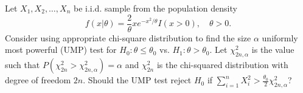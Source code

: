 \begin{problem} 
Let $X_1, X_2, \ldots, X_n$ be i.i.d. sample from the population density
	\[
	f(x|\theta) = \frac{2}{\theta}xe^{-x^2/\theta} I(x>0), \quad \theta>0.
	\] 
Consider using appropriate chi-square distribution to find the size $\alpha$ uniformly most powerful (UMP) test for $H_0: \theta\le \theta_0$ vs. $H_1: \theta> \theta_0$. Let $\chi_{2n, \alpha}^2$ is the value such that $P(\chi_{2n}^2 > \chi_{2n, \alpha}^2) = \alpha$ and $\chi_{2n}^2$ is the chi-squared distribution with degree of freedom $2n$. Should the UMP test reject $H_0$ if $\sum_{i=1}^n X_i^2 > \frac{\theta_0}{2} \chi_{2n, \alpha}^2$? 
\end{problem}
